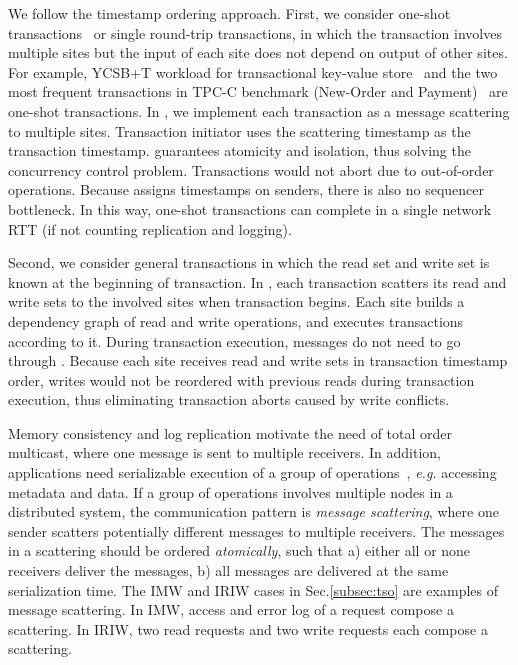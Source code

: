 We follow the timestamp ordering approach.
First, we consider one-shot transactions~\cite{kallman2008h} or single round-trip transactions, in which the transaction involves multiple sites but the input of each site does not depend on output of other sites.
For example, YCSB+T workload for transactional key-value store~\cite{dey2014ycsbt} and the two most frequent transactions in TPC-C benchmark (New-Order and Payment)~\cite{tpcc} are one-shot transactions.
In \sys, we implement each transaction as a message scattering to multiple sites.
Transaction initiator uses the scattering timestamp as the transaction timestamp.
\sys guarantees atomicity and isolation, thus solving the concurrency control problem.
Transactions would not abort due to out-of-order operations.
Because \sys assigns timestamps on senders, there is also no sequencer bottleneck.
In this way, one-shot transactions can complete in a single network RTT (if not counting replication and logging).

Second, we consider general transactions in which the read set and write set is known at the beginning of transaction.
In \sys, each transaction scatters its read and write sets to the involved sites when transaction begins.
Each site builds a dependency graph of read and write operations, and executes transactions according to it.
During transaction execution, messages do not need to go through \sys.
Because each site receives read and write sets in transaction timestamp order, writes would not be reordered with previous reads during transaction execution, thus eliminating transaction aborts caused by write conflicts.


\iffalse
Memory consistency and log replication motivate the need of total order multicast, where one message is sent to multiple receivers.
In addition, applications need serializable execution of a group of operations~\cite{cheriton1994understanding}, \textit{e.g.} accessing metadata and data.
If a group of operations involves multiple nodes in a distributed system, the communication pattern is \textit{message scattering}, where one sender scatters potentially different messages to multiple receivers.
The messages in a scattering should be ordered \textit{atomically}, such that a) either all or none receivers deliver the messages, b) all messages are delivered at the same serialization time.
The IMW and IRIW cases in Sec.\ref{subsec:tso} are examples of  message scattering.
In IMW, access and error log of a request compose a scattering.
In IRIW, two read requests and two write requests each compose a scattering.

